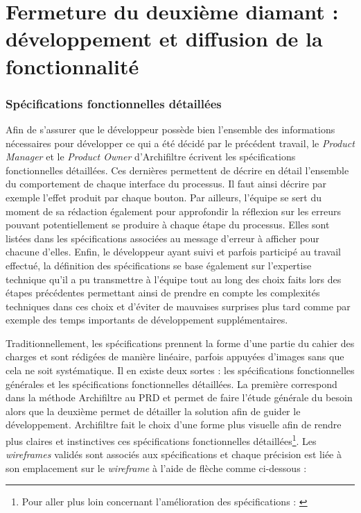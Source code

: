 \chapter{Fermeture du deuxième diamant : développement et diffusion de la fonctionnalité}
\subsection{Spécifications fonctionnelles détaillées}

Afin de s’assurer que le développeur possède bien l’ensemble des informations nécessaires pour développer ce qui a été décidé par le précédent travail, le \textit{\gls{Product Manager}} et le \textit{\gls{Product Owner}} d’\gls{Archifiltre} écrivent les spécifications fonctionnelles détaillées. Ces dernières permettent de décrire en détail l’ensemble du comportement de chaque interface du processus. Il faut ainsi décrire par exemple l’effet produit par chaque bouton. Par ailleurs, l’équipe se sert du moment de sa rédaction également pour approfondir la réflexion sur les erreurs pouvant potentiellement se produire à chaque étape du processus. Elles sont listées dans les spécifications associées au message d’erreur à afficher pour chacune d'elles. Enfin, le développeur ayant suivi et parfois participé au travail effectué, la définition des spécifications se base également sur l’expertise technique qu’il a pu transmettre à l’équipe tout au long des choix faits lors des étapes précédentes permettant ainsi de prendre en compte les complexités techniques dans ces choix et d'éviter de mauvaises surprises plus tard comme par exemple des temps importants de développement supplémentaires. 


Traditionnellement, les spécifications prennent la forme d’une partie du cahier des charges et sont rédigées de manière linéaire, parfois appuyées d’images sans que cela ne soit systématique. Il en existe deux sortes : les spécifications fonctionnelles générales et les spécifications fonctionnelles détaillées. La première correspond dans la méthode \gls{Archifiltre} au \gls{PRD} et permet de faire l’étude générale du besoin alors que la deuxième permet de détailler la solution afin de guider le développement. \gls{Archifiltre} fait le choix d’une forme plus visuelle afin de rendre plus claires et instinctives ces spécifications fonctionnelles détaillées\footnote{Pour aller plus loin concernant l’amélioration des spécifications : \cite{cagan_revisiting_2006}}. Les \textit{\gls{wireframe}s} validés sont associés aux spécifications et chaque précision est liée à son emplacement sur le \textit{\gls{wireframe}} à l’aide de flèche comme ci-dessous : 

